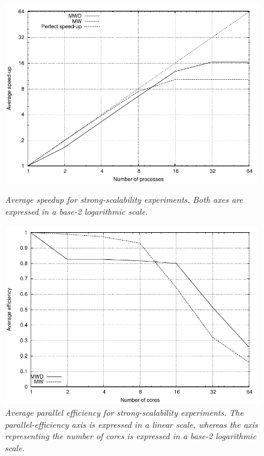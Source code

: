 \begin{figure}
\begin{minipage}[t]{0.48\textwidth}%
\centering

\includegraphics[width=1\columnwidth]{04-framework_design_and_implementation/img/strong_scaling-speedup_plot}

\caption{\textit{\emph{Average speedup for strong-scalability experiments.}}\textit{
}\textit{\emph{Both axes are expressed in a base-2 logarithmic scale.\label{fig:04-Strong_scalability_speedup}}}}
%
\end{minipage}\hfill{}%
\begin{minipage}[t]{0.48\textwidth}%
\centering

\includegraphics[width=1\columnwidth]{04-framework_design_and_implementation/img/strong_scaling-efficiency_plot}

\caption{\textit{\emph{Average parallel efficiency for strong-scalability experiments.}}\textit{
}\textit{\emph{The parallel-efficiency axis is expressed in a linear
scale, whereas the axis representing the number of cores is expressed
in a base-2 logarithmic scale.\label{fig:04-Strong_scalability_efficiency}}}}
%
\end{minipage}
\end{figure}


